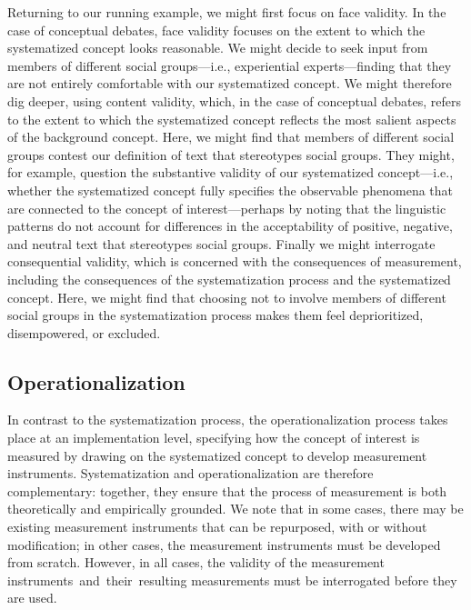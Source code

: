 \documentclass{article}
\begin{document}
Returning to our running example, we might first focus on face validity. In the case of conceptual debates, face validity focuses on the extent to which the systematized concept looks reasonable. We might decide to seek input from members of different social groups---i.e., experiential experts---finding that they are not entirely comfortable with our systematized concept. We might therefore dig deeper, using content validity, which, in the case of conceptual debates, refers to the extent to which the systematized
concept reflects the most salient aspects of the background
concept. Here, we might find that members of different social groups contest our definition of text that stereotypes social groups. 
They might, for example, question the
substantive validity of our systematized concept---i.e., 
whether the systematized concept fully specifies the observable phenomena that are connected to the concept of interest---perhaps
by noting that the linguistic patterns do not account for differences in the acceptability of positive, negative, and neutral text that stereotypes social groups. Finally we might interrogate consequential validity, which is concerned with the consequences of measurement, including the consequences of the systematization process and the systematized concept. Here, we might find that choosing not to involve members of different social groups in the systematization process makes them feel deprioritized, disempowered, or excluded.

\subsection{Operationalization}
\label{sec:operationalization}

In contrast to the systematization process, the operationalization process takes place at an implementation level, specifying how the concept of interest is measured by drawing on the systematized concept to develop measurement instruments. Systematization and operationalization are therefore complementary: together, they ensure that the process of measurement is both theoretically and empirically grounded. We note that in some cases, there may be existing measurement instruments that can be repurposed, with or without modification; 
in other cases, the measurement instruments must be developed from scratch. However, in all cases, the validity of the measurement instruments~and~their~resulting measurements must be interrogated before they are used.
\end{document}
